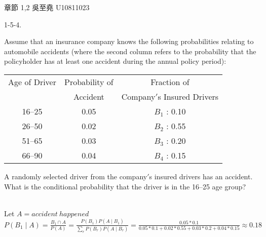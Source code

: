 \documentclass[12pt]{book}
\author{andersonwu2000}
\begin{document}
\begin{CJK}{UTF8}{bsmi}

\hfill 章節 1,2 吳至堯 U10811023

1-5-4. \begin{minipage}[t]{\dimexpr\linewidth-2em}
Assume that an insurance company knows the following probabilities relating to automobile accidents (where the second column refers to the probability that the policyholder has at least one accident during the annual policy period): \\[5pt]
\begin{tabular}{c|c|c}
    Age of Driver & Probability of & Fraction of  \\ 
    & Accident & Company$'$s Insured Drivers \\\hline
    16–25 & 0.05 & $B_1$ : 0.10 \\
    26–50 & 0.02 & $B_2$ : 0.55 \\
    51–65 & 0.03 & $B_3$ : 0.20 \\
    66–90 & 0.04 & $B_4$ : 0.15 \\
\end{tabular}\hspace{2em}\begin{minipage}{16em}
A randomly selected driver from the company$'$s insured drivers has an accident. What is the conditional probability that the driver is in the 16–25 age group?
\end{minipage} \\[5pt]
Let $A=accident\ happened$ \\
$\displaystyle P(B_1\mid A)=\frac{B_1\cap A}{P(A)}=\frac{P(B_1)P(A\mid B_1)}{\sum_rP(B_r)P(A\mid B_r)}=\frac{0.05*0.1}{0.05*0.1+0.02*0.55+0.03*0.2+0.04*0.15}\approx 0.18$
\end{minipage}\\


\end{CJK}
\end{document}
